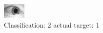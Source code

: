 \begin{figure}[h!]
\begin{center}
\includegraphics[width=0.60\columnwidth]{figures/ID1542_class_2_target_1.png}
\end{center}
\caption{ Classification: 2 actual target: 1}
\label{fig:ID1542_class_2_target_1}
\end{figure}
